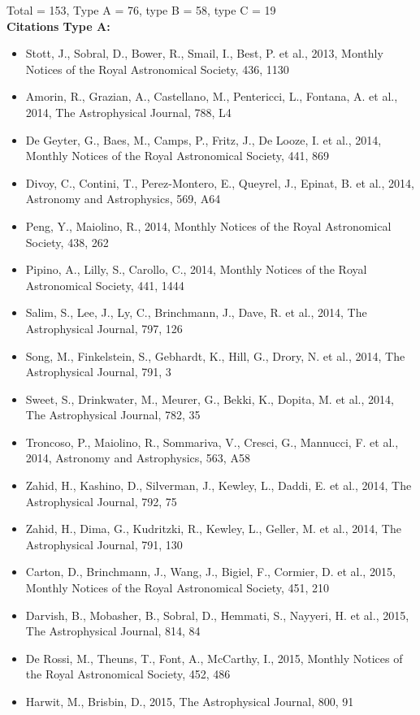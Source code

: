 \documentclass{letter}
\begin{document}
\begin{enumerate}
Total = 153, Type A = 76, type B = 58, type C = 19 \\ 
{\bf Citations Type A:}
\begin{itemize}
\item Stott, J., Sobral, D., Bower, R., Smail, I., Best, P. et al., 2013, Monthly Notices of the Royal Astronomical Society, 436, 1130
\item Amorin, R., Grazian, A., Castellano, M., Pentericci, L., Fontana, A. et al., 2014, The Astrophysical Journal, 788, L4
\item De Geyter, G., Baes, M., Camps, P., Fritz, J., De Looze, I. et al., 2014, Monthly Notices of the Royal Astronomical Society, 441, 869
\item Divoy, C., Contini, T., Perez-Montero, E., Queyrel, J., Epinat, B. et al., 2014, Astronomy and Astrophysics, 569, A64
\item Peng, Y., Maiolino, R., 2014, Monthly Notices of the Royal Astronomical Society, 438, 262
\item Pipino, A., Lilly, S., Carollo, C., 2014, Monthly Notices of the Royal Astronomical Society, 441, 1444
\item Salim, S., Lee, J., Ly, C., Brinchmann, J., Dave, R. et al., 2014, The Astrophysical Journal, 797, 126
\item Song, M., Finkelstein, S., Gebhardt, K., Hill, G., Drory, N. et al., 2014, The Astrophysical Journal, 791, 3
\item Sweet, S., Drinkwater, M., Meurer, G., Bekki, K., Dopita, M. et al., 2014, The Astrophysical Journal, 782, 35
\item Troncoso, P., Maiolino, R., Sommariva, V., Cresci, G., Mannucci, F. et al., 2014, Astronomy and Astrophysics, 563, A58
\item Zahid, H., Kashino, D., Silverman, J., Kewley, L., Daddi, E. et al., 2014, The Astrophysical Journal, 792, 75
\item Zahid, H., Dima, G., Kudritzki, R., Kewley, L., Geller, M. et al., 2014, The Astrophysical Journal, 791, 130
\item Carton, D., Brinchmann, J., Wang, J., Bigiel, F., Cormier, D. et al., 2015, Monthly Notices of the Royal Astronomical Society, 451, 210
\item Darvish, B., Mobasher, B., Sobral, D., Hemmati, S., Nayyeri, H. et al., 2015, The Astrophysical Journal, 814, 84
\item De Rossi, M., Theuns, T., Font, A., McCarthy, I., 2015, Monthly Notices of the Royal Astronomical Society, 452, 486
\item Harwit, M., Brisbin, D., 2015, The Astrophysical Journal, 800, 91

\end{itemize}
\end{enumerate}
\end{document}
